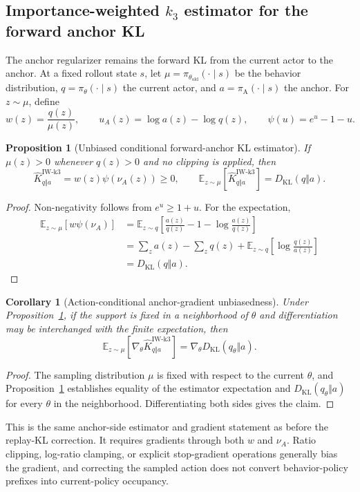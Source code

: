 \documentclass{article}
\newcommand{\pol}{\pi_\theta}
\newcommand{\oldpol}{\pi_{\theta_{\mathrm{old}}}}
\newcommand{\anchorpol}{\pi_{\mathrm A}}
\newcommand{\KL}{D_{\mathrm{KL}}}
\newcommand{\E}{\mathbb{E}}
\newtheorem{proposition}{Proposition}
\newtheorem{corollary}{Corollary}
\begin{document}
\subsection{Importance-weighted $k_3$ estimator for the forward anchor KL}
The anchor regularizer remains the forward KL from the current actor to the anchor. At a fixed rollout state $s$, let $\mu=\oldpol(\cdot\mid s)$ be the behavior distribution, $q=\pol(\cdot\mid s)$ the current actor, and $a=\anchorpol(\cdot\mid s)$ the anchor. For $z\sim\mu$, define
\begin{equation}
w(z)=\frac{q(z)}{\mu(z)},\qquad
u_A(z)=\log a(z)-\log q(z),\qquad
\psi(u)=e^u-1-u.
\end{equation}
\begin{proposition}[Unbiased conditional forward-anchor KL estimator]
\label{prop:iwk3}
If $\mu(z)>0$ whenever $q(z)>0$ and no clipping is applied, then
\begin{equation}
\widehat K_{q\Vert a}^{\mathrm{IW\mbox{-}k3}}
=w(z)\psi(\nu_A(z))\ge0,
\qquad
\E_{z\sim\mu}\!\left[\widehat K_{q\Vert a}^{\mathrm{IW\mbox{-}k3}}\right]
=\KL(q\Vert a).
\label{eq:iwk3_anchor}
\end{equation}
\end{proposition}
\begin{proof}
Non-negativity follows from $e^u\ge1+u$. For the expectation,
\begin{align}
\E_{z\sim\mu}[w\psi(\nu_A)]
&=\E_{z\sim q}\!\left[\frac{a(z)}{q(z)}-1-\log\frac{a(z)}{q(z)}\right]\\
&=\sum_z a(z)-\sum_z q(z)+\E_{z\sim q}\!\left[\log\frac{q(z)}{a(z)}\right]\\
&=\KL(q\Vert a).
\end{align}
\end{proof}

\begin{corollary}[Action-conditional anchor-gradient unbiasedness]
\label{cor:iwk3_gradient}
Under Proposition~\ref{prop:iwk3}, if the support is fixed in a neighborhood of $\theta$ and differentiation may be interchanged with the finite expectation, then
\begin{equation}
\E_{z\sim\mu}\!\left[\nabla_\theta\widehat K_{q\Vert a}^{\mathrm{IW\mbox{-}k3}}\right]
=\nabla_\theta\KL(q_\theta\Vert a).
\end{equation}
\end{corollary}
\begin{proof}
The sampling distribution $\mu$ is fixed with respect to the current $\theta$, and Proposition~\ref{prop:iwk3} establishes equality of the estimator expectation and $\KL(q_\theta\Vert a)$ for every $\theta$ in the neighborhood. Differentiating both sides gives the claim.
\end{proof}
This is the same anchor-side estimator and gradient statement as before the replay-KL correction. It requires gradients through both $w$ and $\nu_A$. Ratio clipping, log-ratio clamping, or explicit stop-gradient operations generally bias the gradient, and correcting the sampled action does not convert behavior-policy prefixes into current-policy occupancy.
\end{document}
